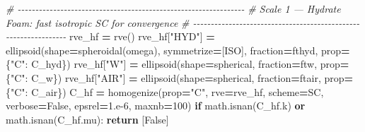 \documentclass[
  a4paper,
  numbers=noendperiod,
  DIV=12]{scrreprt}
\newenvironment{Shaded}{\begin{snugshade}}{\end{snugshade}}
\newcommand{\CommentTok}[1]{\textcolor[rgb]{0.56,0.35,0.01}{\textit{#1}}}
\newcommand{\ControlFlowTok}[1]{\textcolor[rgb]{0.13,0.29,0.53}{\textbf{#1}}}
\newcommand{\DecValTok}[1]{\textcolor[rgb]{0.00,0.00,0.81}{#1}}
\newcommand{\FloatTok}[1]{\textcolor[rgb]{0.00,0.00,0.81}{#1}}
\newcommand{\KeywordTok}[1]{\textcolor[rgb]{0.13,0.29,0.53}{\textbf{#1}}}
\newcommand{\NormalTok}[1]{#1}
\newcommand{\OperatorTok}[1]{\textcolor[rgb]{0.81,0.36,0.00}{\textbf{#1}}}
\newcommand{\StringTok}[1]{\textcolor[rgb]{0.31,0.60,0.02}{#1}}
\newcommand{\VariableTok}[1]{\textcolor[rgb]{0.00,0.00,0.00}{#1}}
\begin{document}
\begin{Shaded}
\begin{Highlighting}[]
    \CommentTok{\# {-}{-}{-}{-}{-}{-}{-}{-}{-}{-}{-}{-}{-}{-}{-}{-}{-}{-}{-}{-}{-}{-}{-}{-}{-}{-}{-}{-}{-}{-}{-}{-}{-}{-}{-}{-}{-}{-}{-}{-}{-}{-}{-}{-}{-}{-}{-}{-}{-}{-}{-}{-}{-}{-}{-}{-}{-}{-}{-}{-}{-}{-}{-}{-}}
    \CommentTok{\# Scale 1 — Hydrate Foam: fast isotropic SC for convergence}
    \CommentTok{\# {-}{-}{-}{-}{-}{-}{-}{-}{-}{-}{-}{-}{-}{-}{-}{-}{-}{-}{-}{-}{-}{-}{-}{-}{-}{-}{-}{-}{-}{-}{-}{-}{-}{-}{-}{-}{-}{-}{-}{-}{-}{-}{-}{-}{-}{-}{-}{-}{-}{-}{-}{-}{-}{-}{-}{-}{-}{-}{-}{-}{-}{-}{-}{-}}
\NormalTok{    rve\_hf }\OperatorTok{=}\NormalTok{ rve()}
\NormalTok{    rve\_hf[}\StringTok{"HYD"}\NormalTok{] }\OperatorTok{=}\NormalTok{ ellipsoid(shape}\OperatorTok{=}\NormalTok{spheroidal(omega), symmetrize}\OperatorTok{=}\NormalTok{[ISO],}
\NormalTok{                               fraction}\OperatorTok{=}\NormalTok{fthyd, prop}\OperatorTok{=}\NormalTok{\{}\StringTok{"C"}\NormalTok{: C\_hyd\})}
\NormalTok{    rve\_hf[}\StringTok{"W"}\NormalTok{]   }\OperatorTok{=}\NormalTok{ ellipsoid(shape}\OperatorTok{=}\NormalTok{spherical, fraction}\OperatorTok{=}\NormalTok{ftw,   prop}\OperatorTok{=}\NormalTok{\{}\StringTok{"C"}\NormalTok{: C\_w\})}
\NormalTok{    rve\_hf[}\StringTok{"AIR"}\NormalTok{] }\OperatorTok{=}\NormalTok{ ellipsoid(shape}\OperatorTok{=}\NormalTok{spherical, fraction}\OperatorTok{=}\NormalTok{ftair, prop}\OperatorTok{=}\NormalTok{\{}\StringTok{"C"}\NormalTok{: C\_air\})}
\NormalTok{    C\_hf }\OperatorTok{=}\NormalTok{ homogenize(prop}\OperatorTok{=}\StringTok{"C"}\NormalTok{, rve}\OperatorTok{=}\NormalTok{rve\_hf, scheme}\OperatorTok{=}\NormalTok{SC,}
\NormalTok{                      verbose}\OperatorTok{=}\VariableTok{False}\NormalTok{, epsrel}\OperatorTok{=}\FloatTok{1.e{-}6}\NormalTok{, maxnb}\OperatorTok{=}\DecValTok{100}\NormalTok{)}
    \ControlFlowTok{if}\NormalTok{ math.isnan(C\_hf.k) }\KeywordTok{or}\NormalTok{ math.isnan(C\_hf.mu):}
        \ControlFlowTok{return}\NormalTok{ [}\VariableTok{False}\NormalTok{]}


\end{Highlighting}
\end{Shaded}
\end{document}

